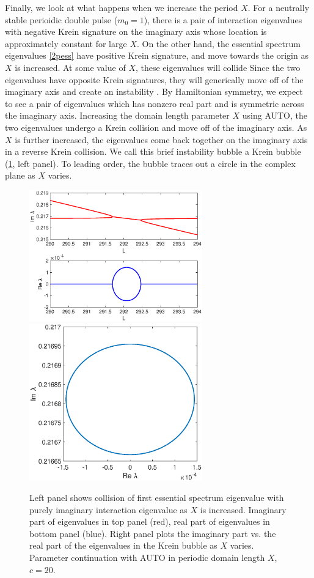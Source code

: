 \documentclass[10pt,reqno]{amsart}
\theoremstyle{plain}
\theoremstyle{definition}
\theoremstyle{remark}
\numberwithin{theorem}{section}
\numberwithin{equation}{section}
\begin{document}
Finally, we look at what happens when we increase the period $X$. For a neutrally stable perioidic double pulse ($m_0 = 1$), there is a pair of interaction eigenvalues with negative Krein signature on the imaginary axis whose location is approximately constant for large $X$. On the other hand, the essential spectrum eigenvalues \cref{2pess} have positive Krein signature, and move towards the origin as $X$ is increased. At some value of $X$, these eigenvalues will collide Since the two eigenvalues have opposite Krein signatures, they will generically move off of the imaginary axis and create an instability \cite[Chapter 7.1]{Kapitula2013}. By Hamiltonian symmetry, we expect to see a pair of eigenvalues which has nonzero real part and is symmetric across the imaginary axis. Increasing the domain length parameter $X$ using AUTO, the two eigenvalues undergo a Krein collision and move off of the imaginary axis. As $X$ is further increased, the eigenvalues come back together on the imaginary axis in a reverse Krein collision. We call this brief instability bubble a Krein bubble (\cref{fig:kreinbubble1}, left panel). To leading order, the bubble traces out a circle in the complex plane as $X$ varies.
\begin{figure}
\begin{center}
\includegraphics[width=7.5cm]{images/kreinbubble1}
\includegraphics[width=7.5cm]{images/kreinbubble1zoom.eps}
\end{center}
\caption{Left panel shows collision of first essential spectrum eigenvalue with purely imaginary interaction eigenvalue as $X$ is increased. Imaginary part of eigenvalues in top panel (red), real part of eigenvalues in bottom panel (blue). Right panel plots the imaginary part vs. the real part of the eigenvalues in the Krein bubble as $X$ varies. Parameter continuation with AUTO in periodic domain length $X$, $c = 20$.}
\label{fig:kreinbubble1}
\end{figure}
\end{document}
